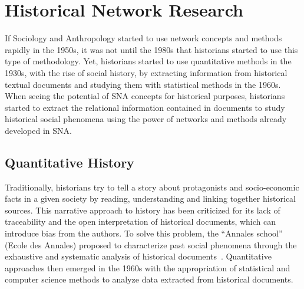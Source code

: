 \section{Historical Network Research}

If Sociology and Anthropology started to use network concepts and methods rapidly in the 1950s, it was not until the 1980s that historians started to use this type of methodology.
Yet, historians started to use quantitative methods in the 1930s, with the rise of social history, by extracting information from historical textual documents and studying them with statistical methods in the 1960s.
When seeing the potential of SNA concepts for historical purposes, historians started to extract the relational information contained in documents to study historical social phenomena using the power of networks and methods already developed in SNA.

\subsection{Quantitative History}


Traditionally, historians try to tell a story about protagonists and socio-economic facts in a given society by reading, understanding and linking together historical sources.
This narrative approach to history has been criticized for its lack of traceability and the open interpretation of historical documents, which can introduce bias from the authors.
To solve this problem, the ``Annales school'' (Ecole des Annales) proposed to characterize past social phenomena through the exhaustive and systematic analysis of historical documents~\cite{prost2014}.
Quantitative approaches then emerged in the 1960s with the appropriation of statistical and computer science methods to analyze data extracted from historical documents.

